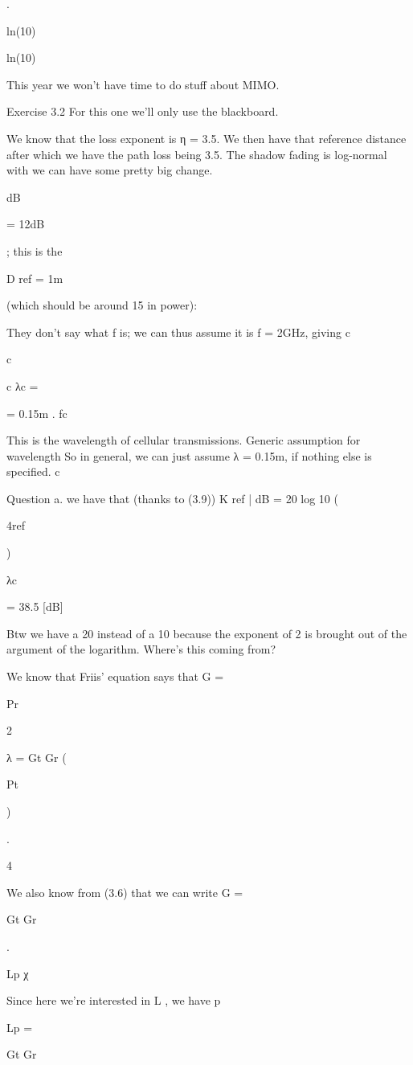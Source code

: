 {{{{\sigma .

ln(10)

ln(10)

This year we won't have time to do stuff about MIMO.

Exercise 3.2 For this one we'll only use the blackboard.

We know that the loss exponent is η = 3.5. We then have that reference distance after which we have the path loss being 3.5.
The shadow fading is log-normal with \sigma we can have some pretty big change.

dB

= 12dB

; this is the

D ref = 1m

(which should be around 15 in power):

They don't say what f is; we can thus assume it is f = 2GHz, giving c

c

c λc =

= 0.15m .
fc

This is the wavelength of cellular transmissions.
​Generic assumption for wavelength So in general, we can just assume λ = 0.15m, if nothing else is specified.
c

Question a. we have that (thanks to (3.9))
K ref | dB = 20 log 10 (

4\piD ref

)

λc

= 38.5 [dB]

Btw we have a 20 instead of a 10 because the exponent of 2 is brought out of the argument of the logarithm.
​Where's this coming from?

We know that Friis' equation says that G =

Pr

2

λ
= Gt Gr (

Pt

)

.

4\pid

We also know from (3.6) that we can write G =

Gt Gr

.

Lp χ

Since here we're interested in L , we have p

Lp =

Gt Gr

}}}}
